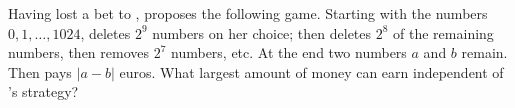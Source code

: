 Having lost a bet to ,  proposes the following game. Starting with the numbers $0, 1, \dots, 1024$,  deletes $2^9$ numbers on her choice; then  deletes $2^8$ of the remaining numbers, then  removes $2^7$ numbers, etc. At the end two numbers $a$ and $b$ remain. Then  pays  $|a-b|$ euros. What largest amount of money can  earn independent of ’s strategy?
